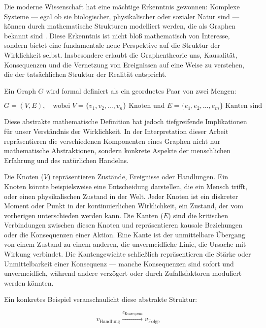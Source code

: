 \documentclass[12pt,a4paper]{article}
\begin{document}
Die moderne Wissenschaft hat eine mächtige Erkenntnis gewonnen: Komplexe Systeme — egal ob sie biologischer, physikalischer oder sozialer Natur sind — können durch mathematische Strukturen modelliert werden, die als Graphen bekannt sind \cite{barabasi2002linked}. Diese Erkenntnis ist nicht bloß mathematisch von Interesse, sondern bietet eine fundamentale neue Perspektive auf die Struktur der Wirklichkeit selbst. Insbesondere erlaubt die Graphentheorie uns, Kausalität, Konsequenzen und die Vernetzung von Ereignissen auf eine Weise zu verstehen, die der tatsächlichen Struktur der Realität entspricht.

Ein Graph $G$ wird formal definiert als ein geordnetes Paar von zwei Mengen:

\begin{equation}
G = (V, E), \quad \text{wobei } V = \{v_1, v_2, \ldots, v_n\} \text{ Knoten und } E = \{e_1, e_2, \ldots, e_m\} \text{ Kanten sind}
\end{equation}

Diese abstrakte mathematische Definition hat jedoch tiefgreifende Implikationen für unser Verständnis der Wirklichkeit. In der Interpretation dieser Arbeit repräsentieren die verschiedenen Komponenten eines Graphen nicht nur mathematische Abstraktionen, sondern konkrete Aspekte der menschlichen Erfahrung und des natürlichen Handelns.

Die Knoten ($V$) repräsentieren Zustände, Ereignisse oder Handlungen. Ein Knoten könnte beispielsweise eine Entscheidung darstellen, die ein Mensch trifft, oder einen physikalischen Zustand in der Welt. Jeder Knoten ist ein diskreter Moment oder Punkt in der kontinuierlichen Wirklichkeit, ein Zustand, der vom vorherigen unterschieden werden kann. Die Kanten ($E$) sind die kritischen Verbindungen zwischen diesen Knoten und repräsentieren kausale Beziehungen oder die Konsequenzen einer Aktion. Eine Kante ist der unmittelbare Übergang von einem Zustand zu einem anderen, die unvermeidliche Linie, die Ursache mit Wirkung verbindet. Die Kantengewichte schließlich repräsentieren die Stärke oder Unmittelbarkeit einer Konsequenz — manche Konsequenzen sind sofort und unvermeidlich, während andere verzögert oder durch Zufallsfaktoren moduliert werden könnten.

Ein konkretes Beispiel veranschaulicht diese abstrakte Struktur:

\begin{equation}
v_{\text{Handlung}} \xrightarrow{e_{\text{Konsequenz}}} v_{\text{Folge}}
\end{equation}
\end{document}
